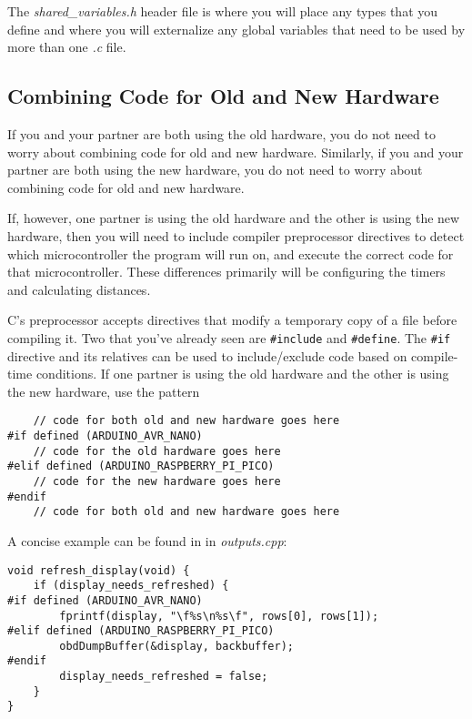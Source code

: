 The \textit{shared\_variables.h} header file is where you will place any types that you define and where you will externalize any global variables that need to be used by more than one \textit{.c} file.


\subsection{Combining Code for Old and New Hardware}

If you and your partner are both using the old hardware, you do not need to worry about combining code for old and new hardware.
Similarly, if you and your partner are both using the new hardware, you do not need to worry about combining code for old and new hardware.

If, however, one partner is using the old hardware and the other is using the new hardware,
then you will need to include compiler preprocessor directives to detect which microcontroller the program will run on,
and execute the correct code for that microcontroller.
These differences primarily will be configuring the timers and calculating distances.

C's preprocessor accepts directives that modify a temporary copy of a file before compiling it.
Two that you've already seen are \lstinline{#include} and \lstinline{#define}.
The \lstinline{#if} directive and its relatives can be used to include/exclude code based on compile-time conditions.
If one partner is using the old hardware and the other is using the new hardware, use the pattern
\begin{lstlisting}
    // code for both old and new hardware goes here
#if defined (ARDUINO_AVR_NANO)
    // code for the old hardware goes here
#elif defined (ARDUINO_RASPBERRY_PI_PICO)
    // code for the new hardware goes here
#endif
    // code for both old and new hardware goes here
\end{lstlisting}

A concise example can be found in  in \textit{outputs.cpp}:

\begin{lstlisting}[firstnumber=109]
void refresh_display(void) {
    if (display_needs_refreshed) {
#if defined (ARDUINO_AVR_NANO)
        fprintf(display, "\f%s\n%s\f", rows[0], rows[1]);
#elif defined (ARDUINO_RASPBERRY_PI_PICO)
        obdDumpBuffer(&display, backbuffer);
#endif
        display_needs_refreshed = false;
    }
}
\end{lstlisting}

